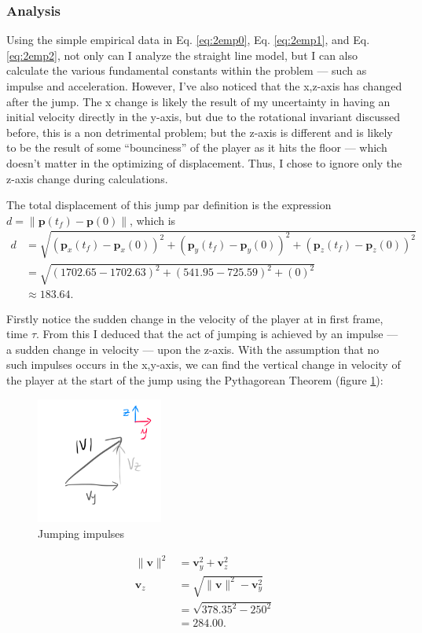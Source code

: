 \documentclass[a4paper,12pt]{article}
\newcommand{\tvec}[1]{\boldsymbol{#1}}
\newcommand{\tmag}[1]{\|#1\|}
\newcommand{\tv}{\tvec{v}}
\newcommand{\tp}{\tvec{p}}
\begin{document}
\subsubsection{Analysis}
Using the simple empirical data in Eq. \ref{eq:2emp0}, Eq. \ref{eq:2emp1}, and Eq. \ref{eq:2emp2}, not only can I analyze the straight line model, but I can also calculate the various fundamental constants within the problem --- such as impulse and acceleration. However, I've also noticed that the x,z-axis has changed after the jump. The x change is likely the result of my uncertainty in having an initial velocity directly in the y-axis, but due to the rotational invariant discussed before, this is a non detrimental problem; but the z-axis is different and is likely to be the result of some ``bounciness'' of the player as it hits the floor --- which doesn't matter in the optimizing of displacement. Thus, I chose to ignore only the z-axis change during calculations.

The total displacement of this jump par definition is the expression $d = \tmag{\tp(t_f) - \tp(0)}$, which is
\begin{align*}
    d &= \sqrt{(\tp_x(t_f) - \tp_x(0))^2 + (\tp_y(t_f) - \tp_y(0))^2 + (\tp_z(t_f) - \tp_z(0))^2}\\
    &= \sqrt{(1702.65-1702.63)^2 + (541.95-725.59)^2 + (0)^2}\\
    &\approx 183.64.
\end{align*}


Firstly notice the sudden change in the velocity of the player at in first frame, time $\tau$. From this I deduced that the act of jumping is achieved by an impulse --- a sudden change in velocity --- upon the z-axis. With the assumption that no such impulses occurs in the x,y-axis, we can find the vertical change in velocity of the player at the start of the jump using the Pythagorean Theorem (figure \ref{fig:2verticalimpulse}):
\begin{figure}
    \includegraphics[width=0.37\textwidth,right]{assets/2verticalimpulse.png}
    \caption{Jumping impulses}
    \label{fig:2verticalimpulse}
\end{figure}
\begin{align*}
    \tmag{\tv}^2 &= \tv_y^2 + \tv_z^2\\
    \tv_z &= \sqrt{\tmag{\tv}^2 - \tv_y^2}\\
    &= \sqrt{378.35^2 -250^2}\\
    &= 284.00.
\end{align*}
\end{document}
